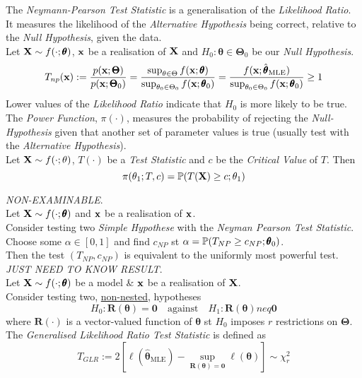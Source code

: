 \documentclass[11pt,a4paper]{article}
\begin{document}
The \textit{Neymann-Pearson Test Statistic} is a generalisation of the \textit{Likelihood Ratio}.\\
It measures the likelihood of the \textit{Alternative Hypothesis} being correct, relative to the \textit{Null Hypothesis}, given the data.\\
Let $\textbf{X}\sim f(\cdot;\pmb\theta)$, $\textbf{x}$ be a realisation of $\textbf{X}$ and $H_0:\pmb\theta\in\pmb\Theta_0$ be our \textit{Null Hypothesis}.
$$T_{np}(\textbf{x}):=\dfrac{p(\textbf{x};\pmb\Theta)}{p(\textbf{x};\pmb\Theta_0)}=\dfrac{\sup_{\theta\in\Theta} f(\textbf{x};\pmb\theta)}{\sup_{\theta_0\in\Theta_0}f(\textbf{x};\pmb\theta_0)}=\dfrac{f(\textbf{x};\hat{\pmb\theta}_\text{MLE})}{\sup_{\theta_0\in\Theta_0}f(\textbf{x};\pmb\theta_0)}\geq1$$
Lower values of the \textit{Likelihood Ratio} indicate that $H_0$ is more likely to be true.\\

The \textit{Power Function}, $\pi(\cdot)$, measures the probability of rejecting the \textit{Null-Hypothesis} given that another set of parameter values is true (usually test with the \textit{Alternative Hypothesis}).\\
Let $\textbf{X}\sim f(\cdot;\theta)$, $T(\cdot)$ be a \textit{Test Statistic} and $c$ be the \textit{Critical Value} of $T$. Then
$$\pi(\theta_1;T,c)=\mathbb{P}(T(\textbf{X})\geq c;\theta_1)$$

\textit{NON-EXAMINABLE}.\\
Let $\textbf{X}\sim f(\cdot;\pmb\theta)$ and $\textbf{x}$ be a realisation of $\textbf{x}$.\\
Consider testing two \textit{Simple Hypothese} with the \textit{Neyman Pearson Test Statistic}.\\
Choose some $\alpha\in[0,1]$ and find $c_{NP}$ st $\alpha=\mathbb{P}(T_{NP}\geq c_{NP};\pmb\theta_0)$.\\
Then the test $(T_{NP},c_{NP})$ is equivalent to the uniformly most powerful test.\\

\textit{JUST NEED TO KNOW RESULT}.\\
Let $\textbf{X}\sim f(\cdot;\pmb\theta)$ be a model \& $\textbf{x}$ be a realisation of $\textbf{X}$.\\
Consider testing two, \underline{non-nested}, hypotheses
$$H_0:\textbf{R}(\pmb\theta)=\pmb0\quad\text{against}\quad H_1:\textbf{R}(\pmb\theta)neq\pmb0$$
where $\textbf{R}(\cdot)$ is a vector-valued function of $\pmb\theta$ st $H_0$ imposes $r$ restrictions on $\pmb\Theta$.\\
The \textit{Generalised Likelihood Ratio Test Statistic} is defined as
$$T_{GLR}:=2[\ell(\hat{\pmb\theta}_\text{MLE})-\sup_{\textbf{R}(\pmb\theta)=\pmb0}\ell(\pmb\theta)]\sim\chi^2_r$$
\end{document}

